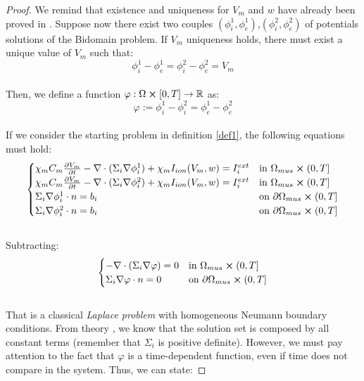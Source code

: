 \documentclass[a4paper,11pt]{article}
\begin{document}
\begin{proof}
	\vspace{2mm} We remind that existence and uniqueness for $V_m$ and $w$ have already been proved in \cite{bourgault}. 
	Suppose now there exist two couples $(\phi_i^1,\phi_e^1)$,$(\phi_i^2,\phi_e^2)$ of potentials solutions of the Bidomain problem. If $V_m$ uniqueness holds, there must exist a unique value of $V_m$ such that:
	\begin{equation*}
	\phi_i^1-\phi_e^1 = \phi_i^2-\phi_e^2 = V_m
	\end{equation*}\\
	Then, we define a function $\varphi:\Omega \cross [0,T] \rightarrow \mathbb{R}$ as:
	\begin{equation*}
	\varphi := \phi_i^1-\phi_i^2 = \phi_e^1-\phi_e^2
	\end{equation*}\\
	If we consider the starting problem in definition \ref{def1}, the following equations must hold:
	\begin{equation*}
	\begin{cases}
	\chi_m C_m\pdv{V_m}{t} - \nabla \cdot (\Sigma_i \nabla \phi_i^1) + \chi_m I_{ion}(V_m,w) = I_i^{ext}    & \text{in } \Omega_{mus} \cross (0,T]
	\\
	\chi_m C_m\pdv{V_m}{t} - \nabla \cdot (\Sigma_i \nabla \phi_i^2) + \chi_m I_{ion}(V_m,w) = I_i^{ext}    & \text{in } \Omega_{mus} \cross (0,T]
	\\
	\Sigma_i\nabla \phi_i^1 \cdot n = b_i   & \text{on } \partial \Omega_{mus} \cross (0,T]
	\\
	\Sigma_i\nabla \phi_i^2 \cdot n = b_i   & \text{on } \partial \Omega_{mus} \cross (0,T]
	\end{cases}
	\end{equation*}\\
	Subtracting:
	\begin{equation*}
	\begin{cases}
	- \nabla \cdot (\Sigma_i \nabla \varphi) = 0    & \text{in } \Omega_{mus} \cross (0,T]
	\\
	\Sigma_i\nabla \varphi \cdot n = 0   & \text{on } \partial \Omega_{mus} \cross (0,T]
	\end{cases}
	\end{equation*} \\
	That is a classical \emph{Laplace problem} with homogeneous Neumann boundary conditions. From theory \cite{salsa}, we know that the solution set is composed by all constant terms (remember that $\Sigma_i$ is positive definite). However, we must pay attention to the fact that $\varphi$ is a time-dependent function, even if time does not compare in the system. Thus, we can state:
	

\end{proof}
\end{document}
